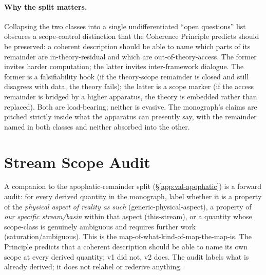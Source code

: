 \paragraph{Why the split matters.}
Collapsing the two classes into a single undifferentiated ``open questions'' list obscures a scope-control distinction that the Coherence Principle predicts should be preserved: a coherent description should be able to name which parts of its remainder are in-theory-residual and which are out-of-theory-access.  The former invites harder computation; the latter invites inter-framework dialogue.  The former is a falsifiability hook (if the theory-scope remainder is closed and still disagrees with data, the theory fails); the latter is a scope marker (if the access remainder is bridged by a higher apparatus, the theory is embedded rather than replaced).  Both are load-bearing; neither is evasive.  The monograph's claims are pitched strictly inside what the apparatus can presently say, with the remainder named in both classes and neither absorbed into the other.

\section{Stream Scope Audit}
\label{app:val-stream-scope}

A companion to the apophatic-remainder split (\S\ref{app:val-apophatic}) is a forward audit: for every derived quantity in the monograph, label whether it is a property of the \emph{physical aspect of reality as such} (generic-physical-aspect), a property of \emph{our specific stream/basin} within that aspect (this-stream), or a quantity whose scope-class is genuinely ambiguous and requires further work (saturation/ambiguous).  This is the map-of-what-kind-of-map-the-map-is.  The Principle predicts that a coherent description should be able to name its own scope at every derived quantity; v1 did not, v2 does.  The audit labels what is already derived; it does not relabel or rederive anything.

